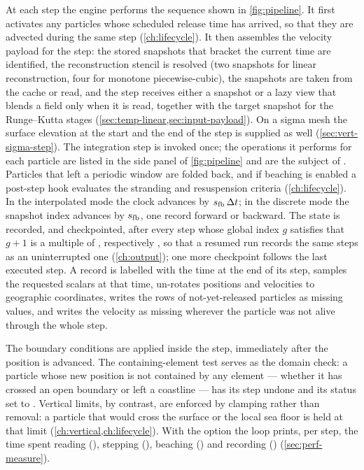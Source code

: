 At each step the engine performs the sequence shown in \cref{fig:pipeline}. It first activates any particles
whose scheduled release time has arrived, so that they are advected during the same step
(\cref{ch:lifecycle}). It then assembles the velocity payload for the step: the stored snapshots that bracket
the current time are identified, the reconstruction stencil is resolved (two snapshots for linear
reconstruction, four for monotone piecewise-cubic), the snapshots are taken from the cache or read, and the
step receives either a snapshot or a lazy view that blends a field only when it is read, together with the
target snapshot for the Runge--Kutta stages (\cref{sec:temp-linear,sec:input-payload}). On a sigma mesh the
surface elevation at the start and the end of the step is supplied as well (\cref{sec:vert-sigma-step}). The
integration step is invoked once; the operations it performs for each particle are listed in the side panel
of \cref{fig:pipeline} and are the subject of . Particles that left
a periodic window are folded back, and if beaching is enabled a post-step hook evaluates the stranding and
resuspension criteria (\cref{ch:lifecycle}). In the interpolated mode the clock advances by $s_{\mathrm{fb}}\,\Delta t$; in the
discrete mode the snapshot index advances by $s_{\mathrm{fb}}$, one record forward or backward. The state is recorded, and checkpointed, after every step
whose global index $g$ satisfies that $g+1$ is a multiple of , respectively
, so that a resumed run records the same steps as an uninterrupted one
(\cref{ch:output}); one more checkpoint follows the last executed step. A record is labelled with the time at
the end of its step, samples the requested scalars at that time, un-rotates positions and velocities to
geographic coordinates, writes the rows of not-yet-released particles as missing values, and writes the
velocity as missing wherever the particle was not alive through the whole step.

The boundary conditions are applied inside the step, immediately after the position is advanced. The
containing-element test serves as the domain check: a particle whose new position is not contained by any
element --- whether it has crossed an open boundary or left a coastline --- has its step undone and its status
set to . Vertical limits, by contrast, are enforced by clamping rather than removal: a particle
that would cross the surface or the local sea floor is held at that limit (\cref{ch:vertical,ch:lifecycle}).
With the option  the loop prints, per step, the time spent reading (), stepping
(), beaching () and recording () (\cref{sec:perf-measure}).

